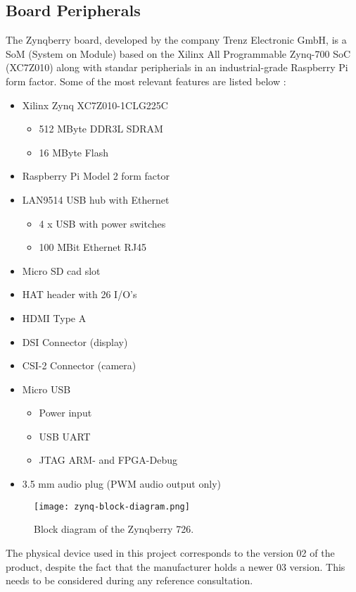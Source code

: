 \subsection{Board Peripherals}

The Zynqberry board, developed by the company Trenz Electronic GmbH, is a SoM (System on Module) based on the Xilinx All Programmable Zynq-700 SoC (XC7Z010) along with standar peripherials in an industrial-grade Raspberry Pi form factor. Some of the most relevant features are listed below \cite{zynq-main}:

\begin{itemize}
	\item Xilinx Zynq XC7Z010-1CLG225C
	\begin{itemize}
		\item 512 MByte DDR3L SDRAM
		\item 16 MByte Flash
	\end{itemize}
	\item Raspberry Pi Model 2 form factor
	\item LAN9514 USB hub with Ethernet
	\begin{itemize}
		\item 4 x USB with power switches
		\item 100 MBit Ethernet RJ45
	\end{itemize}
	\item Micro SD cad slot
	\item HAT header with 26 I/O's
	\item HDMI Type A
	\item DSI Connector (display)
	\item CSI-2 Connector (camera)
	\item Micro USB
	\begin{itemize}
		\item Power input
		\item USB UART
		\item JTAG ARM- and FPGA-Debug
	\end{itemize}
	\item 3.5 mm audio plug (PWM audio output only)
\end{itemize}

\begin{figure}[htp]
	\centering
	\texttt{[image: zynq-block-diagram.png]}
	\caption{Block diagram of the Zynqberry 726.}
	\label{fig:zynqblock}
\end{figure}

The physical device used in this project corresponds to the version 02 of the product, despite the fact that the manufacturer holds a newer 03 version. This needs to be considered during any reference consultation.

